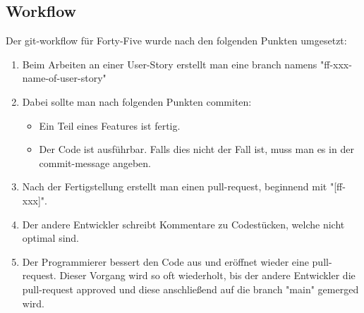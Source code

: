 \renewcommand{\kapitelautor}{Autor: Felix Zwickelstorfer}
\subsection{Workflow}\label{subsec:workflow}

Der git-workflow für Forty-Five wurde nach den folgenden Punkten umgesetzt:
\begin{enumerate}
    \item Beim Arbeiten an einer User-Story erstellt man eine branch namens "ff-xxx-name-of-user-story"
    \item Dabei sollte man nach folgenden Punkten commiten:
    \begin{itemize}
        \item Ein Teil eines Features ist fertig.
        \item Der Code ist ausführbar.
            Falls dies nicht der Fall ist, muss man es in der commit-message angeben.
    \end{itemize}
    \item Nach der Fertigstellung erstellt man einen pull-request, beginnend mit "[ff-xxx]".
    \item Der andere Entwickler schreibt Kommentare zu Codestücken, welche nicht optimal sind.
    \item Der Programmierer bessert den Code aus und eröffnet wieder eine pull-request.
        Dieser Vorgang wird so oft wiederholt, bis der andere Entwickler die pull-request approved und diese anschließend auf die branch "main" gemerged wird.
\end{enumerate}
